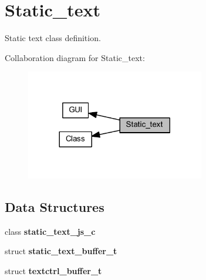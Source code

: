 \section{Static\+\_\+text}
\label{group___static__text}


Static text class definition.  


Collaboration diagram for Static\+\_\+text\+:\nopagebreak
\begin{figure}[H]
\begin{center}
\leavevmode
\includegraphics[width=221pt]{group___static__text}
\end{center}
\end{figure}
\subsection*{Data Structures}
\begin{DoxyCompactItemize}
\item 
class \textbf{ static\+\_\+text\+\_\+js\+\_\+c}
\item 
struct \textbf{ static\+\_\+text\+\_\+buffer\+\_\+t}
\item 
struct \textbf{ textctrl\+\_\+buffer\+\_\+t}
\end{DoxyCompactItemize}
